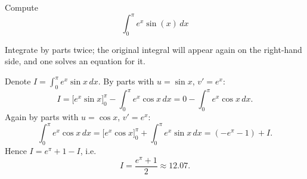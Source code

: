
\begin{question}
Compute
\[ \int_0^{\pi}e^x\sin(x)\,dx \]
\end{question}

\begin{hint}
Integrate by parts twice; the original integral will appear again on the right-hand side, and one solves an equation for it.
\end{hint}

\begin{solution}
Denote $I=\int_0^\pi e^x\sin x\,dx$. By parts with $u=\sin x$, $v'=e^x$:
\[ I=\big[e^x\sin x\big]_0^\pi-\int_0^\pi e^x\cos x\,dx=0-\int_0^\pi e^x\cos x\,dx. \]
Again by parts with $u=\cos x$, $v'=e^x$:
\[ \int_0^\pi e^x\cos x\,dx=\big[e^x\cos x\big]_0^\pi+\int_0^\pi e^x\sin x\,dx=(-e^\pi-1)+I. \]
Hence $I=e^\pi+1-I$, i.e.
\[ I=\boxed{\frac{e^\pi+1}{2}}\approx12.07. \]
\end{solution}
